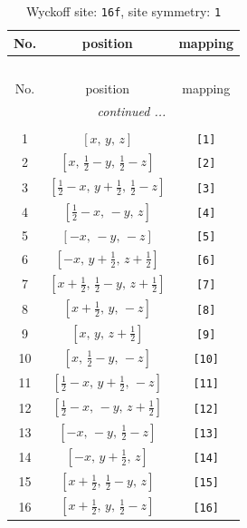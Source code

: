 \documentclass[fleqn,8pt]{jsarticle}
\begin{document}
\begin{longtable}{ccc}
\caption{Wyckoff site: {\tt 16f}, site symmetry: {\tt 1}}
 \\
 \hline \hline
No. & position & mapping \\ \hline \endfirsthead

\multicolumn{2}{l}{\tablename\ \thetable{}} \\
 \hline \hline
No. & position & mapping \\ \hline \endhead

 \hline \hline
\multicolumn{2}{r}{\footnotesize\it continued ...} \\ \endfoot

 \hline \hline
\multicolumn{2}{r}{} \\ \endlastfoot

1 & $\left[ x,\, y,\, z \right]$ & {\tt [1]} \\ \hline
2 & $\left[ x,\, \frac{1}{2} - y,\, \frac{1}{2} - z \right]$ & {\tt [2]} \\ \hline
3 & $\left[ \frac{1}{2} - x,\, y + \frac{1}{2},\, \frac{1}{2} - z \right]$ & {\tt [3]} \\ \hline
4 & $\left[ \frac{1}{2} - x,\, - y,\, z \right]$ & {\tt [4]} \\ \hline
5 & $\left[ - x,\, - y,\, - z \right]$ & {\tt [5]} \\ \hline
6 & $\left[ - x,\, y + \frac{1}{2},\, z + \frac{1}{2} \right]$ & {\tt [6]} \\ \hline
7 & $\left[ x + \frac{1}{2},\, \frac{1}{2} - y,\, z + \frac{1}{2} \right]$ & {\tt [7]} \\ \hline
8 & $\left[ x + \frac{1}{2},\, y,\, - z \right]$ & {\tt [8]} \\ \hline
9 & $\left[ x,\, y,\, z + \frac{1}{2} \right]$ & {\tt [9]} \\ \hline
10 & $\left[ x,\, \frac{1}{2} - y,\, - z \right]$ & {\tt [10]} \\ \hline
11 & $\left[ \frac{1}{2} - x,\, y + \frac{1}{2},\, - z \right]$ & {\tt [11]} \\ \hline
12 & $\left[ \frac{1}{2} - x,\, - y,\, z + \frac{1}{2} \right]$ & {\tt [12]} \\ \hline
13 & $\left[ - x,\, - y,\, \frac{1}{2} - z \right]$ & {\tt [13]} \\ \hline
14 & $\left[ - x,\, y + \frac{1}{2},\, z \right]$ & {\tt [14]} \\ \hline
15 & $\left[ x + \frac{1}{2},\, \frac{1}{2} - y,\, z \right]$ & {\tt [15]} \\ \hline
16 & $\left[ x + \frac{1}{2},\, y,\, \frac{1}{2} - z \right]$ & {\tt [16]} \\
\end{longtable}
\end{document}
